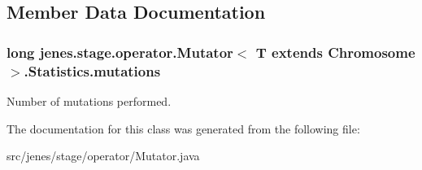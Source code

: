 \subsection{Member Data Documentation}
\hypertarget{classjenes_1_1stage_1_1operator_1_1_mutator_3_01_t_01extends_01_chromosome_01_4_1_1_statistics_4328be89d9643f783f5c08164a0aa916}{
\subsubsection[mutations]{\setlength{\rightskip}{0pt plus 5cm}long jenes.stage.operator.Mutator$<$ T extends Chromosome $>$.Statistics.mutations}}
\label{classjenes_1_1stage_1_1operator_1_1_mutator_3_01_t_01extends_01_chromosome_01_4_1_1_statistics_4328be89d9643f783f5c08164a0aa916}


Number of mutations performed. 

The documentation for this class was generated from the following file:\begin{CompactItemize}
\item 
src/jenes/stage/operator/Mutator.java\end{CompactItemize}
